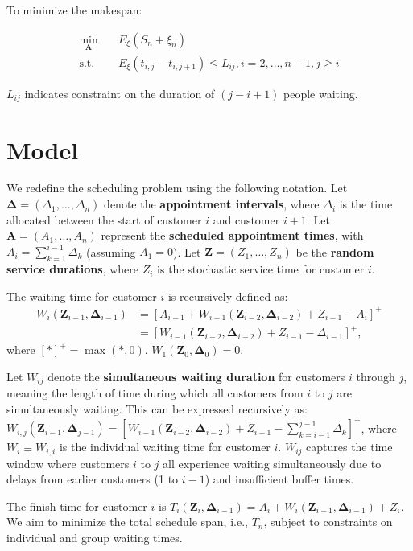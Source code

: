 \documentclass{article}
\newcommand{\Z}{\mathbf{Z}}
\newcommand{\D}{\bm{\Delta}}
\newcommand{\A}{\mathbf{A}}
\begin{document}
To minimize the makespan:

\begin{equation}
    \begin{aligned}
        \min_{\mathbf{A}} \quad & E_{\xi}\left(S_n + \xi_{n}\right) \\
        \mbox{s.t.} \quad & E_{\xi}\left( t_{i,j} - t_{i,j+1} \right) \leq L_{ij}, i =2, \ldots, n-1, j \geq i
    \end{aligned}
\end{equation}

$L_{ij}$ indicates constraint on the duration of $(j-i+1)$ people waiting.


\section{Model}
We redefine the scheduling problem using the following notation. Let $\D = (\Delta_1, \ldots, \Delta_n)$ denote the \textbf{appointment intervals}, where $\Delta_{i}$ is the time allocated between the start of customer $i$ and customer $i+1$. Let $\A = (A_1, \ldots, A_n)$ represent the \textbf{scheduled appointment times}, with $A_{i} = \sum_{k=1}^{i-1} \Delta_{k}$ (assuming $A_{1}=0$). Let $\Z = (Z_1, \ldots, Z_n)$ be the \textbf{random service durations}, where $Z_{i}$ is the stochastic service time for customer $i$.

The waiting time for customer $i$ is recursively defined as:
\begin{align*}
  W_{i}(\Z_{i-1}, \D_{i-1}) &= [A_{i-1} + W_{i-1}(\Z_{i-2}, \D_{i-2}) + Z_{i-1} -A_{i}]^{+} \\
    & = [W_{i-1}(\Z_{i-2}, \D_{i-2}) + Z_{i-1} - \Delta_{i-1}]^{+},
\end{align*}
where $[*]^{+} = \max(*, 0)$. $W_{1}(\Z_{0}, \D_{0}) = 0$.

Let $W_{ij}$ denote the \textbf{simultaneous waiting duration} for customers $i$ through $j$, meaning the length of time during which all customers from $i$ to $j$ are simultaneously waiting. This can be expressed recursively as: $W_{i, j}(\Z_{i-1}, \D_{j-1}) = [W_{i-1}(\Z_{i-2}, \D_{i-2}) + Z_{i-1} - \sum_{k =i-1}^{j-1} \Delta_{k}]^{+}$, where $W_{i} \equiv W_{i,i}$ is the individual waiting time for customer $i$. $W_{ij}$ captures the time window where customers $i$ to $j$ all experience waiting simultaneously due to delays from earlier customers (1 to $i-1$) and insufficient buffer times.


The finish time for customer $i$ is $T_{i}(\Z_{i}, \D_{i-1}) = A_{i} + W_{i}(\Z_{i-1}, \D_{i-1}) + Z_{i}$. We aim to minimize the total schedule span, i.e., $T_{n}$, subject to constraints on individual and group waiting times.
\end{document}
